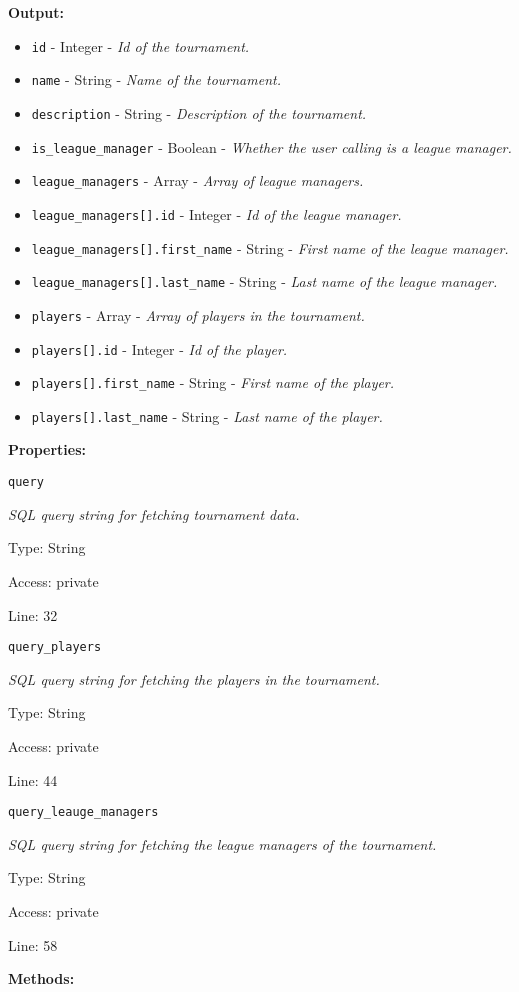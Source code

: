 \textbf{Output:}
\begin{itemize}
\item \texttt{id} - Integer - \textit{Id of the tournament.}
\item \texttt{name} - String - \textit{Name of the tournament.}
\item \texttt{description} - String - \textit{Description of the tournament.}
\item \texttt{is\_league\_manager} - Boolean - \textit{Whether the user calling is a league manager.}
\item \texttt{league\_managers} - Array - \textit{Array of league managers.}
\item \texttt{league\_managers[].id} - Integer - \textit{Id of the league manager.}
\item \texttt{league\_managers[].first\_name} - String - \textit{First name of the league manager.}
\item \texttt{league\_managers[].last\_name} - String - \textit{Last name of the league manager.}
\item \texttt{players} - Array - \textit{Array of players in the tournament.}
\item \texttt{players[].id} - Integer - \textit{Id of the player.}
\item \texttt{players[].first\_name} - String - \textit{First name of the player.}
\item \texttt{players[].last\_name} - String - \textit{Last name of the player.}
\end{itemize}

\textbf{Properties:}

\texttt{query}

{\scriptsize
\textit{SQL query string for fetching tournament data.}

Type: String

Access: private

Line: 32

}
\texttt{query\_players}

{\scriptsize
\textit{SQL query string for fetching the players in the tournament.}

Type: String

Access: private

Line: 44

}
\texttt{query\_leauge\_managers}

{\scriptsize
\textit{SQL query string for fetching the league managers of the tournament.}

Type: String

Access: private

Line: 58

}
\textbf{Methods:}

